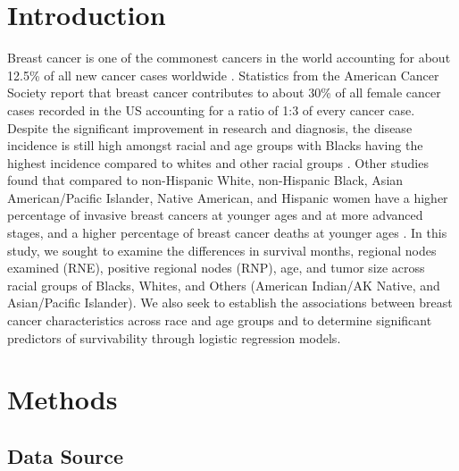 \documentclass[times,sort&compress,3p]{elsarticle}
\theoremstyle{plain}
\theoremstyle{definition}
\begin{document}
\section{Introduction\label{sec:1}}
Breast cancer is one of the commonest cancers in the world accounting for about 12.5\% of all new cancer cases worldwide \cite{breastcancerfactsandstatistics2023} . Statistics from the American Cancer Society \cite{americancancersociety2023} report that breast cancer contributes to about 30\% of all female cancer cases recorded in the US accounting for a ratio of 1:3 of every cancer case.
Despite the significant improvement in research and diagnosis, the disease incidence is still high amongst racial and age groups \cite{foy2018disparities,wojcik1998breast} with Blacks having the highest incidence compared to whites and other racial groups \cite{iqbal2015differences, shoemaker2018differences}. Other studies found that compared to non-Hispanic White,  non-Hispanic Black, Asian American/Pacific Islander, Native American, and Hispanic women have a higher percentage of invasive breast cancers at younger ages and at more advanced stages, and a higher percentage of breast cancer deaths at younger ages \cite{hendrick2021agedistributions}.
In this study, we sought to examine the differences in survival months, regional nodes examined (RNE), positive regional nodes (RNP), age, and tumor size across racial groups of Blacks, Whites, and Others (American Indian/AK Native, and Asian/Pacific Islander). We also seek to establish the associations between breast cancer characteristics across race and age groups and to determine significant predictors of survivability through logistic regression models.

\section{Methods\label{sec:2}}
\subsection{Data Source}
\end{document}
